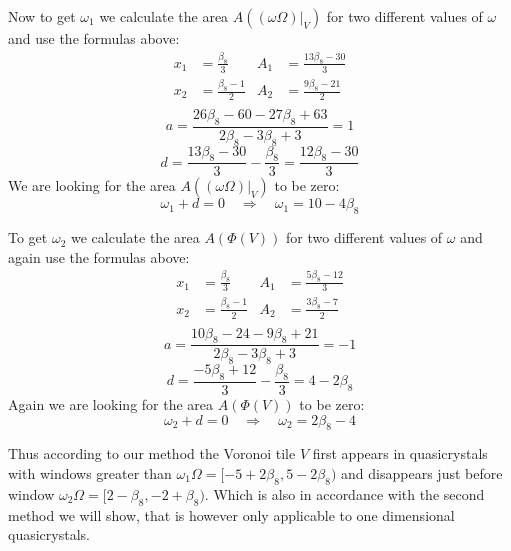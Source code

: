 \documentclass[text.tex]{subfiles}
\begin{document}
Now to get $\omega_1$ we calculate the area $A((\omega\Omega)|_V)$ for two different values of $\omega$ and use the formulas above: 
\begin{align*}
x_1&=\frac{\beta_8}{3} & A_1&=\frac{13\beta_8-30}{3} \\
x_2&=\frac{\beta_8-1}{2} & A_2&=\frac{9\beta_8-21}{2} \\
\end{align*}
$$a = \frac{26\beta_8-60-27\beta_8+63}{2\beta_8-3\beta_8+3} = 1$$
$$d = \frac{13\beta_8-30}{3}-\frac{\beta_8}{3} = \frac{12\beta_8-30}{3}$$
We are looking for the area $A((\omega\Omega)|_V)$ to be zero:
$$\omega_1+d=0\quad\Rightarrow\quad \omega_1 = 10-4\beta_8$$

To get $\omega_2$ we calculate the area $A(\Phi(V))$ for two different values of $\omega$ and again use the formulas above: 
\begin{align*}
x_1&=\frac{\beta_8}{3} & A_1&=\frac{5\beta_8-12}{3} \\
x_2&=\frac{\beta_8-1}{2} & A_2&=\frac{3\beta_8-7}{2} \\
\end{align*}
$$a = \frac{10\beta_8-24-9\beta_8+21}{2\beta_8-3\beta_8+3} = -1$$
$$d = \frac{-5\beta_8+12}{3}-\frac{\beta_8}{3} = 4-2\beta_8$$
Again we are looking for the area $A(\Phi(V))$ to be zero:
$$\omega_2+d=0\quad\Rightarrow\quad \omega_2 = 2\beta_8-4$$

Thus according to our method the Voronoi tile $V$ first appears in quasicrystals with windows greater than $\omega_1\Omega = [-5+2\beta_8, 5-2\beta_8)$ and disappears just before window $\omega_2\Omega = [2-\beta_8, -2+\beta_8)$. Which is also in accordance with the second method we will show, that is however only applicable to one dimensional quasicrystals. 
\end{document}
